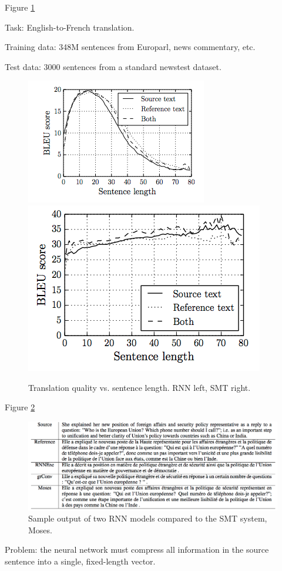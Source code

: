 \documentclass[english]{article}
\begin{document}
\item  Figure \ref{Encoder-Decoder Model}

Task: English-to-French translation.

Training data: 348M sentences from Europarl, news commentary, etc.

Test data: 3000 sentences from a standard newstest dataset.
\begin{figure}
\centering
\includegraphics[height=0.3\linewidth]{encdec-smt1.png}
\includegraphics[height=0.3\linewidth]{encdec-smt2.png}
\caption{Translation quality vs. sentence length. RNN left, SMT right.}
\label{Encoder-Decoder Model}
\end{figure}

 

\item   Figure \ref{Sample-rnn}

\begin{figure}
\centering
\includegraphics[height=0.35\linewidth]{sample-sents.png}
\caption{Sample output of two RNN models compared to the SMT system, Moses.}
\label{Sample-rnn}
\end{figure}
Problem: the neural network must compress all information in the source sentence into a single, fixed-length vector.
 \eenum
\end{document}
